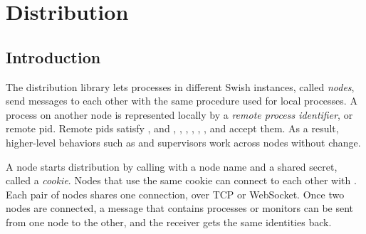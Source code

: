 %
%
%

\chapter {Distribution}\label{chap:dist}

\section {Introduction}

The distribution library lets processes in
different Swish instances, called \emph{nodes}, send
messages to each other with the same  procedure used for
local processes. A process on another node is represented locally by a
\emph{remote process identifier}, or
remote pid. Remote pids satisfy , and ,
, , , ,
, and  accept them. As a result,
higher-level behaviors such as  and supervisors
work across nodes without change.

A node starts distribution by calling  with a
node name and a shared secret, called a \emph{cookie}.
Nodes that use the same cookie can connect to each other with
. Each pair of nodes shares one connection, over TCP
or WebSocket. Once two nodes are connected, a message that contains
processes or monitors can be sent from one node to the other, and the
receiver gets the same identities back.

